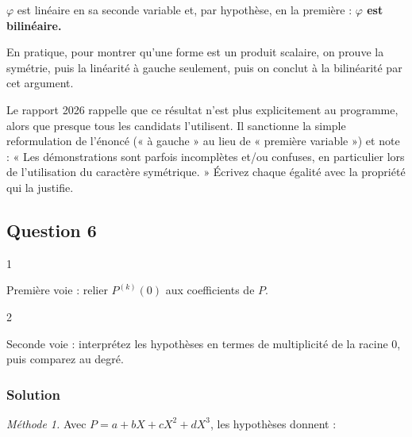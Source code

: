 \documentclass[11pt,a4paper]{article}
\newcommand{\equationajustee}[1]{%
  \sbox{\boiteequation}{$\displaystyle #1$}%
  \ifdim\wd\boiteequation>\linewidth
    \[\resizebox{\linewidth}{!}{\usebox{\boiteequation}}\]%
  \else
    \[#1\]%
  \fi}
\begin{document}
\(\varphi\) est linéaire en sa seconde variable et, par hypothèse, en la première : \textbf{\(\varphi\) est bilinéaire.}

\begin{methode}

En pratique, pour montrer qu'une forme est un produit scalaire, on prouve la symétrie, puis la linéarité à gauche seulement, puis on conclut à la bilinéarité par cet argument.

\end{methode}

\begin{jury}

Le rapport 2026 rappelle que ce résultat n'est plus explicitement au programme, alors que presque tous les candidats l'utilisent. Il sanctionne la simple reformulation de l'énoncé (« à gauche » au lieu de « première variable ») et note : « Les démonstrations sont parfois incomplètes et/ou confuses, en particulier lors de l'utilisation du caractère symétrique. » Écrivez chaque égalité avec la propriété qui la justifie.

\end{jury}

\hypertarget{question-6}{%
\subsection{Question 6}\label{question-6}}

\begin{indication}{1}

Première voie : relier \(P^{(k)}(0)\) aux coefficients de \(P\).

\end{indication}

\begin{indication}{2}

Seconde voie : interprétez les hypothèses en termes de multiplicité de la racine \(0\), puis comparez au degré.

\end{indication}

\hypertarget{solution-5}{%
\subsubsection{Solution}\label{solution-5}}

\emph{Méthode 1.} Avec \(P=a+bX+cX^2+dX^3\), les hypothèses donnent :

\equationajustee{\begin{aligned}
a&=0, & b&=0,\\
2c&=0, & 6d&=0.
\end{aligned}}
\end{document}
